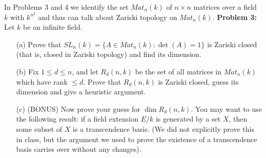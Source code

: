 \documentclass[12pt]{article}
\begin{document}
In Problems 3 and 4 we identify the set $Mat_n(k)$ of $n\times n$ matrices over a field $k$
with $k^{n^2}$ and thus can talk about Zariski topology on $Mat_n(k)$.
\skv
{\bf Problem 3:} Let $k$ be an infinite field.
\begin{itemize}
\item[(a)] Prove that $SL_n(k)=\{A\in Mat_n(k): \det(A)=1\}$ is Zariski closed
(that is, closed in Zariski topology) and find its dimension.

\item[(b)] Fix $1\leq d\leq n$, and let $R_d(n,k)$  be the set of all matrices in $Mat_n(k)$
which have rank $\leq d$. Prove that $R_d(n,k)$ is Zariski closed, guess its dimension and
give a heuristic argument.

\item[(c)] (BONUS) Now prove your guess for $\dim R_d(n,k)$. You may want to use the following result:
if a field extension $E/k$ is generated by a set $X$, then some subset of $X$ is a transcendence
basis. (We did not explicitly prove this in class, but the argument we used to prove the
existence of a transcendence basis carries over without any changes).
\end{itemize}
\end{document}
